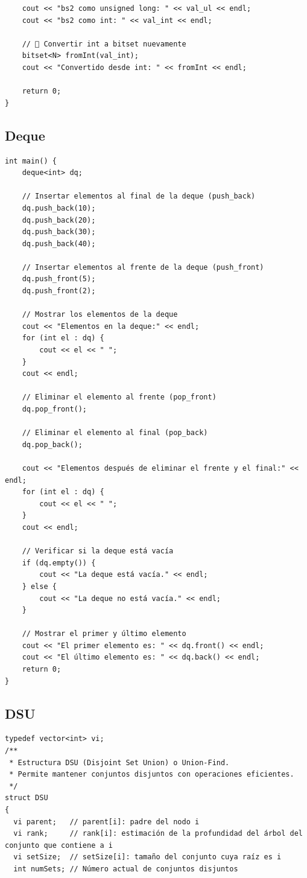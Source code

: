 \documentclass[twoside]{article}
\begin{document}
\begin{multicols*}{2}
\begin{verbatim}
    cout << "bs2 como unsigned long: " << val_ul << endl;
    cout << "bs2 como int: " << val_int << endl;

    // 🔹 Convertir int a bitset nuevamente
    bitset<N> fromInt(val_int);
    cout << "Convertido desde int: " << fromInt << endl;

    return 0;
}

\end{verbatim}

	{
		\subsection*{Deque}
	}
	\begin{verbatim}
int main() {
    deque<int> dq;

    // Insertar elementos al final de la deque (push_back)
    dq.push_back(10);
    dq.push_back(20);
    dq.push_back(30);
    dq.push_back(40);

    // Insertar elementos al frente de la deque (push_front)
    dq.push_front(5);
    dq.push_front(2);

    // Mostrar los elementos de la deque
    cout << "Elementos en la deque:" << endl;
    for (int el : dq) {
        cout << el << " ";
    }
    cout << endl;

    // Eliminar el elemento al frente (pop_front)
    dq.pop_front();

    // Eliminar el elemento al final (pop_back)
    dq.pop_back();

    cout << "Elementos después de eliminar el frente y el final:" << endl;
    for (int el : dq) {
        cout << el << " ";
    }
    cout << endl;

    // Verificar si la deque está vacía
    if (dq.empty()) {
        cout << "La deque está vacía." << endl;
    } else {
        cout << "La deque no está vacía." << endl;
    }

    // Mostrar el primer y último elemento
    cout << "El primer elemento es: " << dq.front() << endl;
    cout << "El último elemento es: " << dq.back() << endl;
    return 0;
}

\end{verbatim}

	{
		\subsection*{DSU}
	}
	\begin{verbatim}
typedef vector<int> vi;
/**
 * Estructura DSU (Disjoint Set Union) o Union-Find.
 * Permite mantener conjuntos disjuntos con operaciones eficientes.
 */
struct DSU
{
  vi parent;   // parent[i]: padre del nodo i
  vi rank;     // rank[i]: estimación de la profundidad del árbol del conjunto que contiene a i
  vi setSize;  // setSize[i]: tamaño del conjunto cuya raíz es i
  int numSets; // Número actual de conjuntos disjuntos


\end{verbatim}
\end{multicols*}
\end{document}
